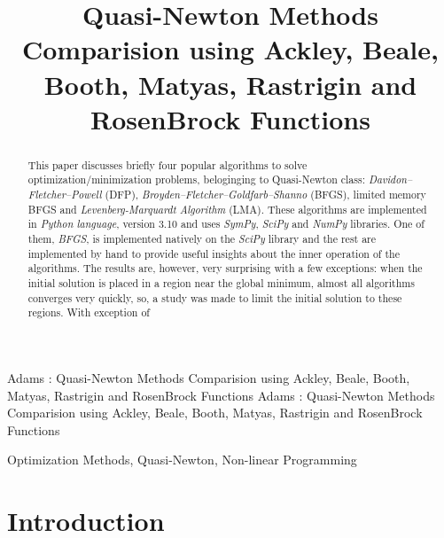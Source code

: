 \documentclass{ieeeaccess}
\begin{document}
\title{Quasi-Newton Methods Comparision using Ackley, Beale, Booth, Matyas, Rastrigin and RosenBrock Functions}
\author{
}

\markboth
{Adams \headeretal: Quasi-Newton Methods Comparision using Ackley, Beale, Booth, Matyas, Rastrigin and RosenBrock Functions}
{Adams \headeretal: Quasi-Newton Methods Comparision using Ackley, Beale, Booth, Matyas, Rastrigin and RosenBrock Functions}

\begin{abstract}
This paper discusses briefly four popular algorithms to solve optimization/minimization problems, beloginging to Quasi-Newton class: \textit{Davidon–Fletcher–Powell} (DFP), \textit{Broyden–Fletcher–Goldfarb–Shanno} (BFGS), limited memory BFGS and \textit{Levenberg-Marquardt Algorithm} (LMA). These algorithms are implemented in \textit{Python language}, version 3.10 and uses \textit{SymPy}, \textit{SciPy} and \textit{NumPy} libraries. One of them, \textit{BFGS}, is implemented natively on the  \textit{SciPy} library and the rest are implemented by hand to provide useful insights about the inner operation of the algorithms. The results are, however, very surprising with a few exceptions: when the initial solution is placed in a region near the global minimum, almost all algorithms converges very quickly, so, a study was made to limit the initial solution to  these regions. With exception of 
\end{abstract}

\begin{keywords} 
Optimization Methods, Quasi-Newton, Non-linear Programming
\end{keywords}

\titlepgskip=-15pt

\maketitle

\section{Introduction}
\label{sec:introduction}
\end{document}
